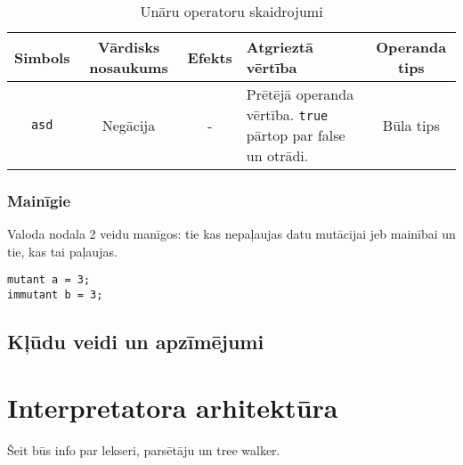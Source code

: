 \documentclass[12pt,a4paper]{report}
\begin{document}
\begin{table}[h]
\centering
\begin{tabular}{|c|c|c|p{5cm}|c|}
\hline
\textbf{Simbols} & \textbf{Vārdisks nosaukums} & \textbf{Efekts} & \textbf{Atgrieztā vērtība} & \textbf{Operanda tips} \\
\hline
\texttt{asd} & Negācija & - & Prētējā operanda vērtība. \texttt{true} pārtop par false un otrādi. & Būla tips \\
\hline
\end{tabular}
\caption{Unāru operatoru skaidrojumi}
\label{tab:symbol-values}
\end{table}


\subsection{Mainīgie}
\label{section:vars}

Valoda nodala 2 veidu manīgos: tie kas nepaļaujas datu mutācijai jeb mainībai un tie, kas tai paļaujas.


\begin{verbatim}
mutant a = 3;
immutant b = 3;
\end{verbatim}


\section{Kļūdu veidi un apzīmējumi}

\chapter{Interpretatora arhitektūra}
\label{chap:arch}

Šeit būs info par lekseri, parsētāju un tree walker.



   
\end{document}
